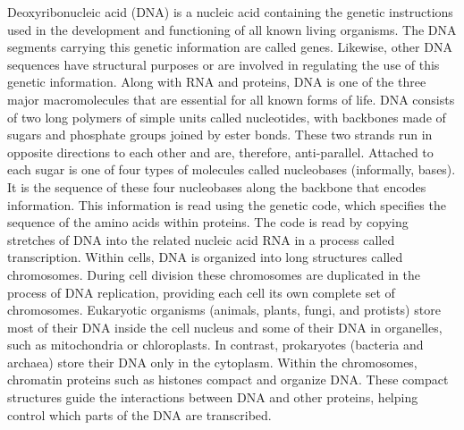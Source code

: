 Deoxyribonucleic acid (DNA) is a nucleic acid containing the genetic instructions used in the development and functioning of all known living organisms. The DNA segments carrying this genetic information are called genes. Likewise, other DNA sequences have structural purposes or are involved in regulating the use of this genetic information. Along with RNA and proteins, DNA is one of the three major macromolecules that are essential for all known forms of life. DNA consists of two long polymers of simple units called nucleotides, with backbones made of sugars and phosphate groups joined by ester bonds. These two strands run in opposite directions to each other and are, therefore, anti-parallel. Attached to each sugar is one of four types of molecules called nucleobases (informally, bases). It is the sequence of these four nucleobases along the backbone that encodes information. This information is read using the genetic code, which specifies the sequence of the amino acids within proteins. The code is read by copying stretches of DNA into the related nucleic acid RNA in a process called transcription. Within cells, DNA is organized into long structures called chromosomes. During cell division these chromosomes are duplicated in the process of DNA replication, providing each cell its own complete set of chromosomes. Eukaryotic organisms (animals, plants, fungi, and protists) store most of their DNA inside the cell nucleus and some of their DNA in organelles, such as mitochondria or chloroplasts. In contrast, prokaryotes (bacteria and archaea) store their DNA only in the cytoplasm. Within the chromosomes, chromatin proteins such as histones compact and organize DNA. These compact structures guide the interactions between DNA and other proteins, helping control which parts of the DNA are transcribed.




